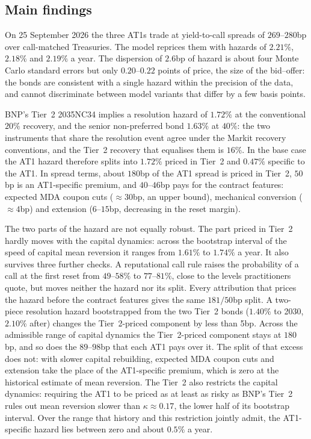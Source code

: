 \subsection{Main findings}

On 25 September 2026 the three AT1s trade at yield-to-call spreads of $269$--$280$bp
over call-matched Treasuries. The model reprices them with hazards of $2.21\%$,
$2.18\%$ and $2.19\%$ a year. The dispersion of $2.6$bp of hazard is about four
Monte Carlo standard errors but only $0.20$--$0.22$ points of price, the size of the
bid--offer: the bonds are consistent with a single hazard within the precision of the
data, and cannot discriminate between model variants that differ by a few basis points.

BNP's Tier~2 2035NC34 implies a resolution hazard of $1.72\%$ at the conventional
$20\%$ recovery, and the senior non-preferred bond $1.63\%$ at $40\%$: the two
instruments that share the resolution event agree under the Markit recovery
conventions, and the Tier~2 recovery that equalises them is $16\%$. In the base case
the AT1 hazard therefore splits into $1.72\%$ priced in Tier~2 and $0.47\%$ specific to
the AT1. In spread terms, about $180$bp of the AT1 spread is priced in Tier~2, $50$bp is
an AT1-specific premium, and $40$--$46$bp pays for the contract features: expected MDA
coupon cuts ($\approx30$bp, an upper bound), mechanical conversion ($\approx4$bp)
and extension ($6$--$15$bp, decreasing in the reset margin).

The two parts of the hazard are not equally robust. The part priced in Tier~2 hardly
moves with the capital dynamics: across the bootstrap interval of the speed of capital
mean reversion it ranges from $1.61\%$ to $1.74\%$ a year. It also survives three
further checks. A reputational call rule raises the probability of a call at the first
reset from $49$--$58\%$ to $77$--$81\%$, close to the levels practitioners quote, but
moves neither the hazard nor its split. Every attribution that prices the hazard before
the contract features gives the same $181/50$bp split. A two-piece resolution hazard
bootstrapped from the two Tier~2 bonds ($1.40\%$ to 2030, $2.10\%$ after) changes the
Tier~2-priced component by less than 5bp. Across the admissible range of capital
dynamics the Tier~2-priced component stays at $180$bp, and so does the $89$--$98$bp that
each AT1 pays over it. The split of that excess does not: with slower capital rebuilding,
expected MDA coupon cuts and extension take the place of the AT1-specific premium, which
is zero at the historical estimate of mean reversion. The Tier~2 also restricts the
capital dynamics: requiring the AT1 to be priced as at least as risky as BNP's Tier~2
rules out mean reversion slower than $\kappa\approx0.17$, the lower half of its bootstrap
interval. Over the range that history and this restriction jointly admit, the
AT1-specific hazard lies between zero and about $0.5\%$ a year.

